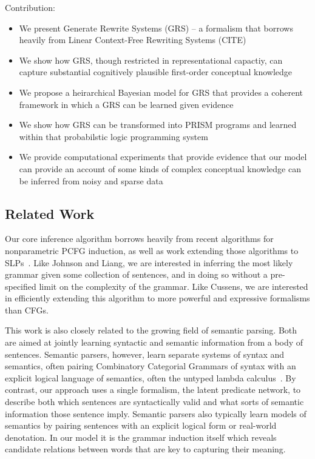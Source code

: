 \documentclass[11pt, twocolumn]{article}
\begin{document}
Contribution:
\begin{itemize}
\item We present Generate Rewrite Systems (GRS) -- a formalism that borrows
  heavily from Linear Context-Free Rewriting Systems (CITE)
\item We show how GRS, though restricted in representational capactiy,
  can capture substantial cognitively plausible first-order conceptual knowledge 
\item We propose a heirarchical Bayesian model for GRS that provides a coherent framework in which a GRS can be learned given evidence
\item We show how GRS can be transformed into PRISM programs and learned within that probabilstic logic programming system
\item We provide computational experiments that provide evidence that
  our model can provide an account of some kinds of complex conceptual
  knowledge can be inferred from noisy and sparse data
\end{itemize}

\subsection{Related Work}
Our core inference algorithm borrows heavily from recent algorithms for nonparametric PCFG induction, as well as work extending those algorithms to SLPs~\cite{DBLP:conf/emnlp/LiangPJK07,goldwater2006contextual,johnson2006adaptor,cussens2001parameter}. Like Johnson and Liang, we are interested in inferring the most likely grammar given some collection of sentences, and in doing so without a pre-specified limit on the complexity of the grammar. Like Cussens, we are interested in efficiently extending this algorithm to more powerful and expressive formalisms than CFGs.

This work is also closely related to the growing field of semantic parsing. Both are aimed at jointly learning syntactic and semantic information from a body of sentences. Semantic parsers, however, learn separate systems of syntax and semantics, often pairing Combinatory Categorial Grammars of syntax with an explicit logical language of semantics, often the untyped lambda calculus~\cite{berant2013semantic,liang2013learning,kwiatkowski2010inducing}. By contrast, our approach uses a single formalism, the latent predicate network, to describe both which sentences are syntactically valid and what sorts of semantic information those sentence imply. Semantic parsers also typically learn models of semantics by pairing sentences with an explicit logical form or real-world denotation. In our model it is the grammar induction itself which reveals candidate relations between words that are key to capturing their meaning.
\end{document}
